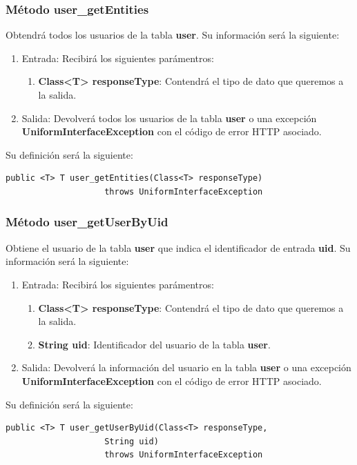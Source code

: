 \subsubsection{Método user\_getEntities}
Obtendrá todos los usuarios de la tabla \textbf{user}. Su información será la siguiente:
\begin{enumerate}
\item Entrada: Recibirá los siguientes parámentros:
\begin{enumerate}
\item \textbf{Class<T> responseType}: Contendrá el tipo de dato que queremos a la salida. 
\end{enumerate}
\item Salida: Devolverá todos los usuarios de la tabla \textbf{user} o una excepción \textbf{UniformInterfaceException} con el código de error HTTP asociado.
\end{enumerate}
\bigskip
\par
Su definición será la siguiente:
\begin{verbatim}public <T> T user_getEntities(Class<T> responseType) 
					throws UniformInterfaceException\end{verbatim}

\subsubsection{Método user\_getUserByUid}
Obtiene el usuario de la tabla \textbf{user} que indica el identificador de entrada \textbf{uid}. Su información será la siguiente:
\begin{enumerate}
\item Entrada: Recibirá los siguientes parámentros:
\begin{enumerate}
\item \textbf{Class<T> responseType}: Contendrá el tipo de dato que queremos a la salida. 
\item \textbf{String uid}: Identificador del usuario de la tabla \textbf{user}.
\end{enumerate}
\item Salida: Devolverá la información del usuario en la tabla \textbf{user} o una excepción \textbf{UniformInterfaceException} con el código de error HTTP asociado.
\end{enumerate}
\bigskip
\par
Su definición será la siguiente:
\begin{verbatim}public <T> T user_getUserByUid(Class<T> responseType, 
					String uid) 
					throws UniformInterfaceException\end{verbatim}

